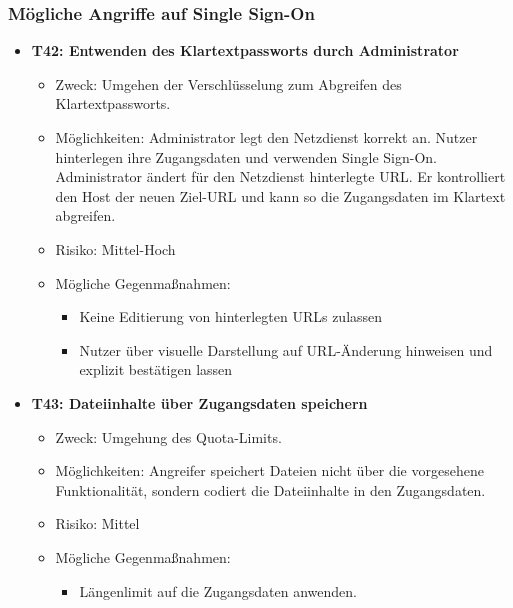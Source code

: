 \documentclass[12pt,DIV14,BCOR10mm,a4paper,parskip=half-,headsepline,headinclude,english,ngerman,bibliography=totocnumbered]{scrreprt}
\begin{document}
\subsubsection{Mögliche Angriffe auf Single Sign-On}
\begin{itemize}

  \hypertarget{threat42}{}
  \item \textbf{T42: Entwenden des Klartextpassworts durch Administrator}
  \begin{itemize}
    \item Zweck: Umgehen der Verschlüsselung zum Abgreifen des Klartextpassworts.
    \item Möglichkeiten: Administrator legt den Netzdienst korrekt an. Nutzer hinterlegen ihre Zugangsdaten und verwenden Single Sign-On. Administrator ändert für den Netzdienst hinterlegte URL. Er kontrolliert den Host der neuen Ziel-URL und kann so die Zugangsdaten im Klartext abgreifen.
    \item Risiko: Mittel-Hoch
    \item Mögliche Gegenmaßnahmen:
      \begin{itemize}
      \item Keine Editierung von hinterlegten URLs zulassen
      \item Nutzer über visuelle Darstellung auf URL-Änderung hinweisen und explizit bestätigen lassen
      \end{itemize}
  \end{itemize}
  
  \hypertarget{threat43}{}
  \item \textbf{T43: Dateiinhalte über Zugangsdaten speichern}
  \begin{itemize}
    \item Zweck: Umgehung des Quota-Limits.
    \item Möglichkeiten: Angreifer speichert Dateien nicht über die vorgesehene Funktionalität, sondern codiert die Dateiinhalte in den Zugangsdaten.
    \item Risiko: Mittel
    \item Mögliche Gegenmaßnahmen:
      \begin{itemize}
      	\item Längenlimit auf die Zugangsdaten anwenden.
      \end{itemize}
  \end{itemize}
  

\end{itemize}
\end{document}
